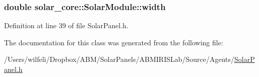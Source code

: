 \hypertarget{classsolar__core_1_1_solar_module_a72b5c417f88deb65818e96b5fcf52ef9}{}
\subsubsection[{width}]{\setlength{\rightskip}{0pt plus 5cm}double solar\+\_\+core\+::\+Solar\+Module\+::width}\label{classsolar__core_1_1_solar_module_a72b5c417f88deb65818e96b5fcf52ef9}


Definition at line 39 of file Solar\+Panel.\+h.



The documentation for this class was generated from the following file\+:\begin{DoxyCompactItemize}
\item 
/\+Users/wilfeli/\+Dropbox/\+A\+B\+M/\+Solar\+Panels/\+A\+B\+M\+I\+R\+I\+S\+Lab/\+Source/\+Agents/\hyperlink{_solar_panel_8h}{Solar\+Panel.\+h}\end{DoxyCompactItemize}
